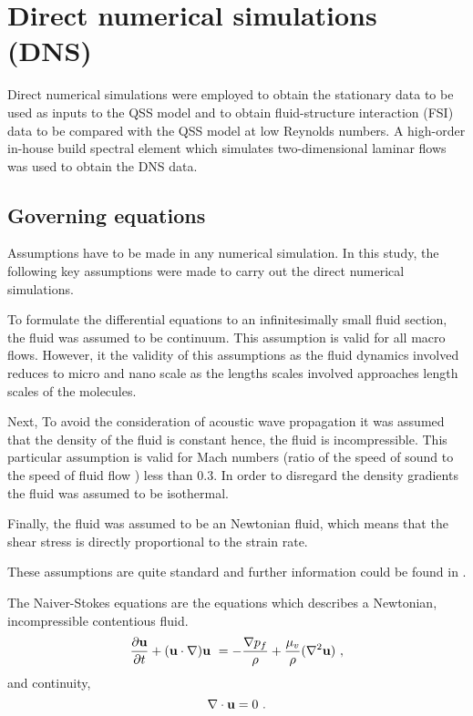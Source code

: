\section{Direct numerical simulations (DNS)}

Direct numerical simulations were employed to obtain the stationary data to be used as inputs to the QSS model and to obtain  fluid-structure interaction (FSI) data to be compared with the QSS model at low Reynolds numbers. A high-order in-house build spectral element which simulates two-dimensional laminar flows was used to obtain the DNS data.

\subsection{Governing equations}
 
 Assumptions have to be made in any numerical simulation. In this study, the following key assumptions were made to carry out the direct numerical simulations. 
 
 To formulate the differential equations to an infinitesimally small fluid section, the fluid was assumed to be continuum. This assumption is valid for all macro flows. However, it the validity of this assumptions as the fluid dynamics involved reduces to micro and nano scale as the lengths scales involved approaches length scales of the molecules.
 
 Next, To avoid the consideration of acoustic wave propagation it was assumed that the density of the fluid is constant hence, the fluid is incompressible. This particular assumption is valid for Mach numbers (ratio of the speed of sound to the speed of fluid flow ) less than 0.3. In order to disregard the density gradients the fluid was assumed to be isothermal. 
 
 Finally, the fluid was assumed to be an Newtonian fluid, which means that the shear stress is directly proportional to the strain rate. 
 
 These assumptions are quite standard and further information could be found in \citet{White99}.        

The Naiver-Stokes equations are the equations which describes a Newtonian, incompressible contentious fluid.
  \begin{equation} \centering
  \label{eq:nsdim}
  \pderiv{\vecu}{t} + (\vecu\cdot\nabla)\vecu\ = -\frac{\grad{\pres}}{\density} + \frac{\dynvis}{\density}(\gradsq{\vecu})~,
  \end{equation}
  and continuity,
  \begin{equation} \centering
  \divergence{\vecu} = 0~.
  \end{equation}
  
